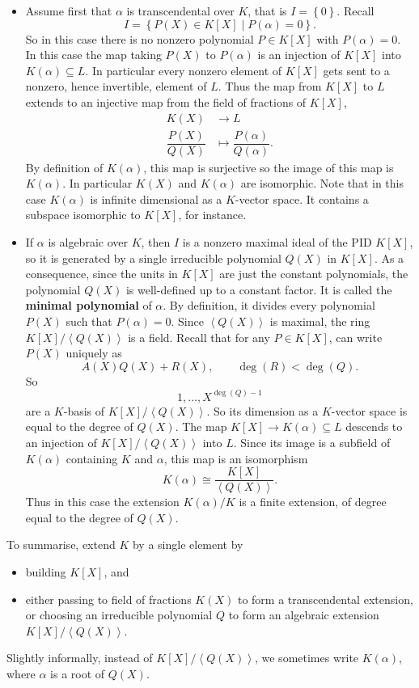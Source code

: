 \documentclass{article}
\newcommand{\rb}[1]{\left( #1 \right)}
\renewcommand{\sb}[1]{\left[ #1 \right]}
\newcommand{\cb}[1]{\left\{ #1 \right\}}
\newcommand{\ab}[1]{\left\langle #1 \right\rangle}
\theoremstyle{definition}\newtheorem{definition}{Definition}[subsection]
\theoremstyle{definition}\newtheorem{remark}[definition]{Remark}
\theoremstyle{definition}\newtheorem*{example}{Example}
\theoremstyle{definition}\newtheorem*{note}{Note}
\begin{document}
\begin{itemize}
\item Assume first that $ \alpha $ is transcendental over $ K $, that is $ I = \cb{0} $. Recall
$$ I = \cb{P\rb{X} \in K\sb{X} \mid P\rb{\alpha} = 0}. $$
So in this case there is no nonzero polynomial $ P \in K\sb{X} $ with $ P\rb{\alpha} = 0 $. In this case the map taking $ P\rb{X} $ to $ P\rb{\alpha} $ is an injection of $ K\sb{X} $ into $ K\rb{\alpha} \subseteq L $. In particular every nonzero element of $ K\sb{X} $ gets sent to a nonzero, hence invertible, element of $ L $. Thus the map from $ K\sb{X} $ to $ L $ extends to an injective map from the field of fractions of $ K\sb{X} $,
\begin{align*}
K\rb{X} & \to L \\
\dfrac{P\rb{X}}{Q\rb{X}} & \mapsto \dfrac{P\rb{\alpha}}{Q\rb{\alpha}}.
\end{align*}
By definition of $ K\rb{\alpha} $, this map is surjective so the image of this map is $ K\rb{\alpha} $. In particular $ K\rb{X} $ and $ K\rb{\alpha} $ are isomorphic. Note that in this case $ K\rb{\alpha} $ is infinite dimensional as a $ K $-vector space. It contains a subspace isomorphic to $ K\sb{X} $, for instance.
\item If $ \alpha $ is algebraic over $ K $, then $ I $ is a nonzero maximal ideal of the PID $ K\sb{X} $, so it is generated by a single irreducible polynomial $ Q\rb{X} $ in $ K\sb{X} $. As a consequence, since the units in $ K\sb{X} $ are just the constant polynomials, the polynomial $ Q\rb{X} $ is well-defined up to a constant factor. It is called the \textbf{minimal polynomial} of $ \alpha $. By definition, it divides every polynomial $ P\rb{X} $ such that $ P\rb{\alpha} = 0 $. Since $ \ab{Q\rb{X}} $ is maximal, the ring $ K\sb{X} / \ab{Q\rb{X}} $ is a field. Recall that for any $ P \in K\sb{X} $, can write $ P\rb{X} $ uniquely as
$$ A\rb{X}Q\rb{X} + R\rb{X}, \qquad \deg\rb{R} < \deg\rb{Q}. $$
So
$$ 1, \dots, X^{\deg\rb{Q} - 1} $$
are a $ K $-basis of $ K\sb{X} / \ab{Q\rb{X}} $. So its dimension as a $ K $-vector space is equal to the degree of $ Q\rb{X} $. The map $ K\sb{X} \to K\rb{\alpha} \subseteq L $ descends to an injection of $ K\sb{X} / \ab{Q\rb{X}} $ into $ L $. Since its image is a subfield of $ K\rb{\alpha} $ containing $ K $ and $ \alpha $, this map is an isomorphism
$$ K\rb{\alpha} \cong \dfrac{K\sb{X}}{\ab{Q\rb{X}}}. $$
Thus in this case the extension $ K\rb{\alpha} / K $ is a finite extension, of degree equal to the degree of $ Q\rb{X} $.
\end{itemize}
To summarise, extend $ K $ by a single element by
\begin{itemize}
\item building $ K\sb{X} $, and
\item either passing to field of fractions $ K\rb{X} $ to form a transcendental extension, or choosing an irreducible polynomial $ Q $ to form an algebraic extension $ K\sb{X} / \ab{Q\rb{X}} $.
\end{itemize}
Slightly informally, instead of $ K\sb{X} / \ab{Q\rb{X}} $, we sometimes write $ K\rb{\alpha} $, where $ \alpha $ is a root of $ Q\rb{X} $.
\end{document}
